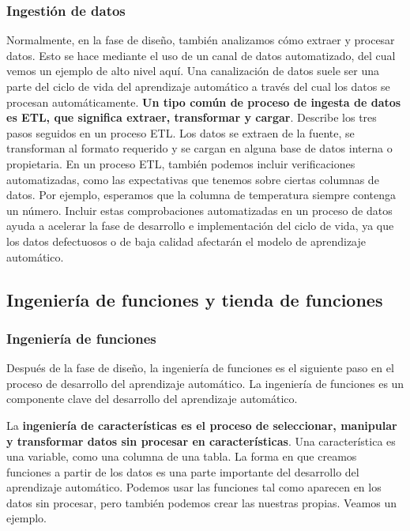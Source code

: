 \documentclass[10pt]{book}
\begin{document}
\subsubsection{Ingestión de datos}
Normalmente, en la fase de diseño, también analizamos cómo extraer y procesar datos. Esto se hace mediante el uso de un canal de datos automatizado, del cual vemos un ejemplo de alto nivel aquí. Una canalización de datos suele ser una parte del ciclo de vida del aprendizaje automático a través del cual los datos se procesan automáticamente. \textbf{Un tipo común de proceso de ingesta de datos es ETL, que significa extraer, transformar y cargar}. Describe los tres pasos seguidos en un proceso ETL. Los datos se extraen de la fuente, se transforman al formato requerido y se cargan en alguna base de datos interna o propietaria. En un proceso ETL, también podemos incluir verificaciones automatizadas, como las expectativas que tenemos sobre ciertas columnas de datos. Por ejemplo, esperamos que la columna de temperatura siempre contenga un número. Incluir estas comprobaciones automatizadas en un proceso de datos ayuda a acelerar la fase de desarrollo e implementación del ciclo de vida, ya que los datos defectuosos o de baja calidad afectarán el modelo de aprendizaje automático.


\subsection{Ingeniería de funciones y tienda de funciones}

\subsubsection{Ingeniería de funciones}
Después de la fase de diseño, la ingeniería de funciones es el siguiente paso en el proceso de desarrollo del aprendizaje automático. La ingeniería de funciones es un componente clave del desarrollo del aprendizaje automático.

La \textbf{ingeniería de características es el proceso de seleccionar, manipular y transformar datos sin procesar en características}. Una característica es una variable, como una columna de una tabla. La forma en que creamos funciones a partir de los datos es una parte importante del desarrollo del aprendizaje automático. Podemos usar las funciones tal como aparecen en los datos sin procesar, pero también podemos crear las nuestras propias. Veamos un ejemplo.
\end{document}
